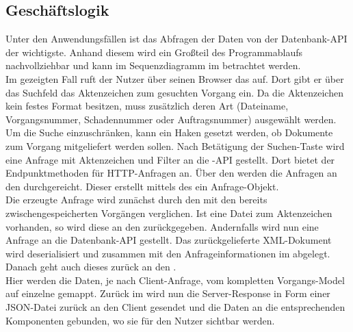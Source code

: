 \subsection{Geschäftslogik}
\label{sec:Geschaeftslogik}
Unter den Anwendungsfällen ist das Abfragen der Daten von der Datenbank-\acs{API} der wichtigste.
Anhand diesem wird ein Großteil des Programmablaufs nachvollziehbar und kann im Sequenzdiagramm
im  betrachtet werden.\\
Im gezeigten Fall ruft der Nutzer über seinen Browser das  auf.
Dort gibt er über das Suchfeld das Aktenzeichen zum gesuchten Vorgang ein. Da die Aktenzeichen kein festes 
Format besitzen, muss zusätzlich deren Art (Dateiname, Vorgangsnummer, Schadennummer oder Auftragsnummer)
ausgewählt werden. Um die Suche einzuschränken, kann ein Haken gesetzt werden, ob Dokumente zum Vorgang mitgeliefert werden sollen.
Nach Betätigung der Suchen-Taste wird eine Anfrage mit Aktenzeichen und Filter an die 
-\acs{API} gestellt. Dort bietet der  Endpunktmethoden für \acs{HTTP}-Anfragen an.
Über den  werden die Anfragen an den  durchgereicht.
Dieser erstellt mittels des  ein Anfrage-Objekt.\\
Die erzeugte Anfrage wird zunächst durch den  mit den bereits zwischengespeicherten
Vorgängen verglichen. Ist eine Datei zum Aktenzeichen vorhanden, so wird diese an den  
zurückgegeben. Andernfalls wird nun eine Anfrage an die Datenbank-API gestellt.
Das zurückgelieferte \acs{XML}-Dokument wird deserialisiert und zusammen mit den Anfrageinformationen im  abgelegt.
Danach geht auch dieses zurück an den .\\
Hier werden die Daten, je nach Client-Anfrage, vom kompletten Vorgangs-Model auf einzelne  gemappt.
Zurück im  wird nun die Server-Response in Form einer \acs{JSON}-Datei zurück an den Client gesendet und die Daten
an die entsprechenden Komponenten gebunden, wo sie für den Nutzer sichtbar werden.

